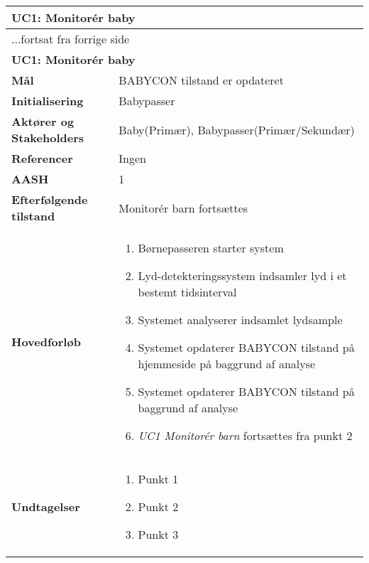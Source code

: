 \begin{center} \centering \label{kravspec:uc1}
	\begin{longtable}{|p{5cm}|p{9cm}|}  %
	\hline
		\multicolumn{2}{|l|}{\textbf{UC1: Monitorér baby}} \\\hline %
		\endfirsthead
		
		\multicolumn{2}{l}{...fortsat fra forrige side} \\ \hline %
		\multicolumn{2}{|l|}{\textbf{UC1: Monitorér baby}} \\\hline %
		\endhead	
		
		\textbf{Mål}							&BABYCON tilstand er opdateret		\\\hline
		\textbf{Initialisering}				&Babypasser		\\\hline
		\textbf{Aktører og Stakeholders}		&Baby(Primær), Babypasser(Primær/Sekundær)		\\\hline 
		\textbf{Referencer}					&Ingen		\\\hline
		\textbf{AASH}						&1		\\\hline
		\textbf{Efterfølgende tilstand}		&Monitorér barn fortsættes		\\\hline
		\textbf{Hovedforløb}					
			&\begin{enumerate}
	
				\item Børnepasseren starter system
				
				\item Lyd-detekteringssystem indsamler lyd i et bestemt tidsinterval 				
				
				\item Systemet analyserer indsamlet lydsample 
				
				\item Systemet opdaterer BABYCON tilstand på hjemmeside på baggrund af analyse 				
				
				\item Systemet opdaterer BABYCON tilstand på baggrund af analyse
				
				\item \textit{UC1 Monitorér barn} fortsættes fra punkt 2
				
			\end{enumerate}
		\\\hline
		\textbf{Undtagelser}
			&\begin{enumerate}
			
				\item Punkt 1

				\item Punkt 2
				
				\item Punkt 3

			\end{enumerate}
		\\\hline
	\end{longtable} 
\end{center}

